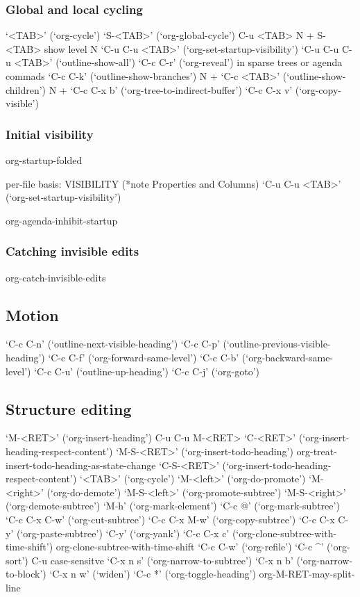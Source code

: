 \documentclass[11pt]{article}
\begin{document}
\subsubsection{Global and local cycling}
\label{sec:org3e6facc}
‘<TAB>’     (‘org-cycle’)
‘S-<TAB>’     (‘org-global-cycle’)
C-u <TAB>
N + S-<TAB>   show level N 
‘C-u C-u <TAB>’     (‘org-set-startup-visibility’)
‘C-u C-u C-u <TAB>’     (‘outline-show-all’)
‘C-c C-r’     (‘org-reveal’) in sparse trees or agenda commads
‘C-c C-k’     (‘outline-show-branches’)
N + ‘C-c <TAB>’     (‘outline-show-children’)
N + ‘C-c C-x b’     (‘org-tree-to-indirect-buffer’)
‘C-c C-x v’     (‘org-copy-visible’)
\subsubsection{Initial visibility}
\label{sec:org221532f}
org-startup-folded

per-file basis:
VISIBILITY (*note Properties and Columns)
‘C-u C-u <TAB>’     (‘org-set-startup-visibility’)

org-agenda-inhibit-startup
\subsubsection{Catching invisible edits}
\label{sec:org838bed7}
org-catch-invisible-edits
\subsection{Motion}
\label{sec:org7535c8e}
‘C-c C-n’     (‘outline-next-visible-heading’)
‘C-c C-p’     (‘outline-previous-visible-heading’)
‘C-c C-f’     (‘org-forward-same-level’)
‘C-c C-b’     (‘org-backward-same-level’)
‘C-c C-u’     (‘outline-up-heading’)
‘C-c C-j’     (‘org-goto’)
\subsection{Structure editing}
\label{sec:orgad8f5a6}
 ‘M-<RET>’     (‘org-insert-heading’)
 C-u C-u M-<RET>
 ‘C-<RET>’     (‘org-insert-heading-respect-content’)
 ‘M-S-<RET>’     (‘org-insert-todo-heading’) org-treat-insert-todo-heading-as-state-change
 ‘C-S-<RET>’     (‘org-insert-todo-heading-respect-content’)
 ‘<TAB>’     (‘org-cycle’)
 ‘M-<left>’     (‘org-do-promote’)
 ‘M-<right>’     (‘org-do-demote’)
 ‘M-S-<left>’     (‘org-promote-subtree’)
 ‘M-S-<right>’     (‘org-demote-subtree’)
 ‘M-h’     (‘org-mark-element’)
‘C-c @’     (‘org-mark-subtree’)
‘C-c C-x C-w’     (‘org-cut-subtree’)
‘C-c C-x M-w’     (‘org-copy-subtree’)
‘C-c C-x C-y’     (‘org-paste-subtree’)
‘C-y’     (‘org-yank’)
‘C-c C-x c’     (‘org-clone-subtree-with-time-shift’) org-clone-subtree-with-time-shift
‘C-c C-w’     (‘org-refile’)
‘C-c \^{}’     (‘org-sort’)   C-u case-sensitve
‘C-x n s’     (‘org-narrow-to-subtree’)
‘C-x n b’     (‘org-narrow-to-block’)
‘C-x n w’     (‘widen’)
‘C-c *’     (‘org-toggle-heading’)
org-M-RET-may-split-line
\end{document}
